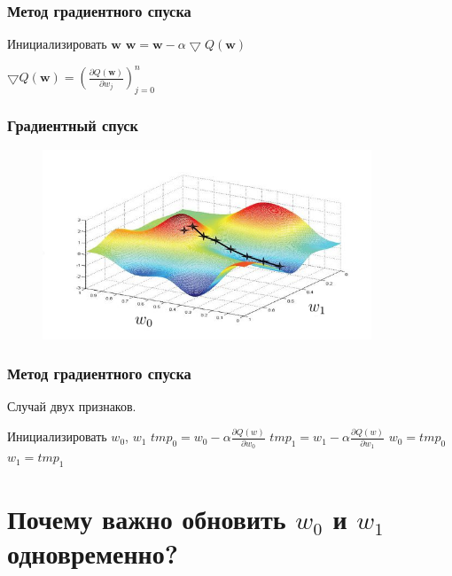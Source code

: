 \documentclass[10pt]{beamer}
\begin{document}
{
\begin{frame}\frametitle{Метод градиентного спуска}
  \begin{algorithmic}[1]
     \State Инициализировать $\mathbf{w}$
       \State $\mathbf{w} =  \mathbf{w} - \alpha \bigtriangledown Q(\mathbf{w})$
     \EndRepeat
    \EndFunction
  \end{algorithmic}
  \bigbreak
  \bigbreak
  \bigbreak
	$\bigtriangledown Q(\mathbf{w}) = (\frac{\partial Q(\mathbf{w})}{\partial w_j})_{j=0}^n$\\
\end{frame}
}

\begin{frame}\frametitle{Градиентный спуск}
	\begin{figure}[htbp]
	  \includegraphics[height=160pt, keepaspectratio = true]{images/gradient_descent}
	\end{figure}
\end{frame}

\begin{frame}\frametitle{Метод градиентного спуска}
	Случай двух признаков.\\
	\begin{algorithmic}[1]
     \State Инициализировать $w_0$, $w_1$
       \State $tmp_0 =  w_0 - \alpha \frac{\partial Q(w)}{\partial w_0}$
       \State $tmp_1 =  w_1 - \alpha \frac{\partial Q(w)}{\partial w_1}$
       \State $w_0 = tmp_0$
       \State $w_1 = tmp_1$
     \EndRepeat
    \EndFunction
  \end{algorithmic}
\end{frame}

\section{Почему важно обновить $w_0$ и $w_1$ одновременно?}
\end{document}
